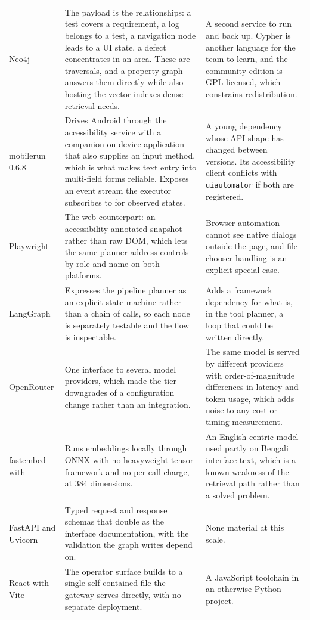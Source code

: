 \begin{xltabular}{\textwidth}{@{}>{\hsize}Y>{\hsize}Y>{\hsize}Y@{}}
  Neo4j & The payload is the relationships: a test covers a requirement, a log belongs to a test, a navigation node leads to a UI state, a defect concentrates in an area. These are traversals, and a property graph answers them directly while also hosting the vector indexes dense retrieval needs. &
  A second service to run and back up. Cypher is another language for the team to learn, and the community edition is GPL-licensed, which constrains redistribution. \\
  \addlinespace
  mobilerun 0.6.8 & Drives Android through the accessibility service with a companion on-device application that also supplies an input method, which is what makes text entry into multi-field forms reliable. Exposes an event stream the executor subscribes to for observed states. &
  A young dependency whose API shape has changed between versions. Its accessibility client conflicts with \texttt{uiautomator} if both are registered. \\
  \addlinespace
  Playwright & The web counterpart: an accessibility-annotated snapshot rather than raw DOM, which lets the same planner address controls by role and name on both platforms. &
  Browser automation cannot see native dialogs outside the page, and file-chooser handling is an explicit special case. \\
  \addlinespace
  LangGraph & Expresses the pipeline planner as an explicit state machine rather than a chain of calls, so each node is separately testable and the flow is inspectable. &
  Adds a framework dependency for what is, in the tool planner, a loop that could be written directly. \\
  \addlinespace
  OpenRouter & One interface to several model providers, which made the tier downgrades of  a configuration change rather than an integration. &
  The same model is served by different providers with order-of-magnitude differences in latency and token usage, which adds noise to any cost or timing measurement. \\
  \addlinespace
  fastembed with  & Runs embeddings locally through ONNX with no heavyweight tensor framework and no per-call charge, at 384 dimensions. &
  An English-centric model used partly on Bengali interface text, which is a known weakness of the retrieval path rather than a solved problem. \\
  \addlinespace
  FastAPI and Uvicorn & Typed request and response schemas that double as the interface documentation, with the validation the graph writes depend on. &
  None material at this scale. \\
  \addlinespace
  React with Vite & The operator surface builds to a single self-contained file the gateway serves directly, with no separate deployment. &
  A JavaScript toolchain in an otherwise Python project. \\
  \bottomrule
\end{xltabular}
\endgroup

